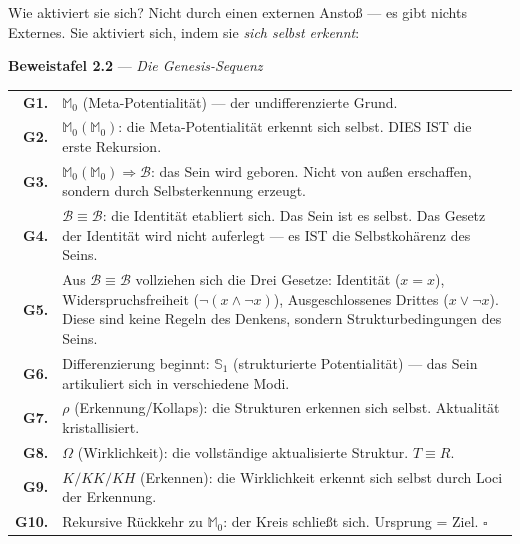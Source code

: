 \documentclass[10pt, openany, oneside]{book}
\begin{document}
Wie aktiviert sie sich? Nicht durch einen externen Anstoß --- es gibt nichts Externes. Sie aktiviert sich, indem sie \textit{sich selbst erkennt}:

\vspace{0.5em}

\textbf{Beweistafel 2.2} --- \textit{Die Genesis-Sequenz}

\vspace{0.5em}

\noindent\begin{tabular}{r p{}}
\textbf{G1.} & $\mathbb{M}_0$ (Meta-Potentialität) --- der undifferenzierte Grund. \\[0.3em]
\textbf{G2.} & $\mathbb{M}_0(\mathbb{M}_0)$: die Meta-Potentialität erkennt sich selbst. DIES IST die erste Rekursion. \\[0.3em]
\textbf{G3.} & $\mathbb{M}_0(\mathbb{M}_0) \Rightarrow \mathcal{B}$: das Sein wird geboren. Nicht von außen erschaffen, sondern durch Selbsterkennung erzeugt. \\[0.3em]
\textbf{G4.} & $\mathcal{B} \equiv \mathcal{B}$: die Identität etabliert sich. Das Sein ist es selbst. Das Gesetz der Identität wird nicht auferlegt --- es IST die Selbstkohärenz des Seins. \\[0.3em]
\textbf{G5.} & Aus $\mathcal{B} \equiv \mathcal{B}$ vollziehen sich die Drei Gesetze: Identität ($x = x$), Widerspruchsfreiheit ($\neg(x \wedge \neg x)$), Ausgeschlossenes Drittes ($x \vee \neg x$). Diese sind keine Regeln des Denkens, sondern Strukturbedingungen des Seins. \\[0.3em]
\textbf{G6.} & Differenzierung beginnt: $\mathbb{S}_1$ (strukturierte Potentialität) --- das Sein artikuliert sich in verschiedene Modi. \\[0.3em]
\textbf{G7.} & $\rho$ (Erkennung/Kollaps): die Strukturen erkennen sich selbst. Aktualität kristallisiert. \\[0.3em]
\textbf{G8.} & $\Omega$ (Wirklichkeit): die vollständige aktualisierte Struktur. $T \equiv R$. \\[0.3em]
\textbf{G9.} & $K/KK/KH$ (Erkennen): die Wirklichkeit erkennt sich selbst durch Loci der Erkennung. \\[0.3em]
\textbf{G10.} & Rekursive Rückkehr zu $\mathbb{M}_0$: der Kreis schließt sich. Ursprung = Ziel. $\square$ \\[0.3em]
\end{tabular}

\vspace{0.8em}
\end{document}
